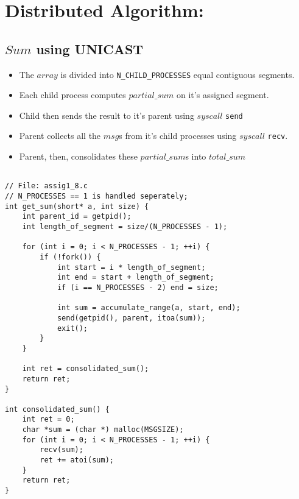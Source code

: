 \documentclass[12pt]{article}
\begin{document}
\newpage
\section{Distributed Algorithm:}
\subsection {$Sum$ using UNICAST}
\begin{itemize}
    \item The $array$ is divided into \texttt{N\_CHILD\_PROCESSES} equal
        contiguous segments.
    \item Each child process computes $partial\_sum$ on it's assigned segment.
    \item Child then sends the result to it's parent using $syscall$ \texttt{send}
    \item Parent collects all the $msg$s from it's child processes
        using $syscall$ \texttt{recv}.
    \item Parent, then, consolidates these $partial\_sum$s into $total\_sum$
\end{itemize}
\begin{lstlisting}

// File: assig1_8.c
// N_PROCESSES == 1 is handled seperately;
int get_sum(short* a, int size) {
    int parent_id = getpid();
    int length_of_segment = size/(N_PROCESSES - 1);

    for (int i = 0; i < N_PROCESSES - 1; ++i) {
        if (!fork()) {
            int start = i * length_of_segment;
            int end = start + length_of_segment;
            if (i == N_PROCESSES - 2) end = size;

            int sum = accumulate_range(a, start, end);
            send(getpid(), parent, itoa(sum));
            exit();
        }
    }

    int ret = consolidated_sum();
    return ret;
}

int consolidated_sum() {
    int ret = 0;
    char *sum = (char *) malloc(MSGSIZE);
    for (int i = 0; i < N_PROCESSES - 1; ++i) {
        recv(sum);
        ret += atoi(sum);
    }
    return ret;
}
\end{lstlisting}
\end{document}
